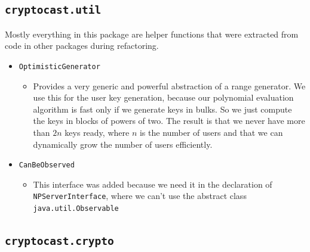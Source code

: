 \documentclass[a4paper,10pt]{scrartcl}
\begin{document}
\subsection{\lstinline|cryptocast.util|}

Mostly everything in this package are helper functions that were extracted from code
in other packages during refactoring.

\begin{itemize}
  \item \lstinline|OptimisticGenerator|
  \begin{itemize}
   \item Provides a very generic and powerful abstraction of a range generator. We use this
   for the user key generation, because our polynomial evaluation algorithm is fast only
   if we generate keys in bulks. So we just compute the keys in blocks of powers of two.
   The result is that we never have more than $2n$ keys ready, where $n$ is the number of users
   and that we can dynamically grow the number of users efficiently.
  \end{itemize}

  \item \lstinline|CanBeObserved|
  \begin{itemize}
   \item This interface was added because we need it in the declaration of \lstinline|NPServerInterface|,
   where we can't use the abstract class \lstinline|java.util.Observable|
  \end{itemize}

  \end{itemize}

\subsection{\lstinline|cryptocast.crypto|}
\end{document}
